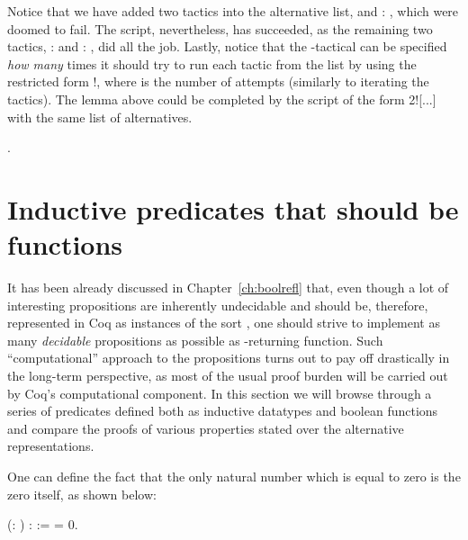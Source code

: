 Notice that we have added two tactics into the alternative list,
 and : , which were doomed to fail. The script,
nevertheless, has succeeded, as the remaining two tactics, : 
and : , did all the job. Lastly, notice that the -tactical
can be specified \textit{how many} times it should try to run each tactic
from the list by using the restricted form  !, where  is
the number of attempts (similarly to iterating the 
tactics). The lemma above could be completed by the script of the form
  2![...] with the same list of alternatives.


\begin{coqdoccode}
\coqdocemptyline
\coqdocnoindent
{}.\coqdoceol
\coqdocemptyline
\end{coqdoccode}


\section{Inductive predicates that should be functions}


It has been already discussed in Chapter~\ref{ch:boolrefl} that,
even though a lot of interesting propositions are inherently
undecidable and should be, therefore, represented in Coq as instances
of the sort , one should strive to implement as many 
\textit{decidable} propositions as possible as -returning
function. Such ``computational'' approach to the propositions turns out
to pay off drastically in the long-term perspective, as most of the
usual proof burden will be carried out by Coq's computational
component. In this section we will browse through a series of
predicates defined both as inductive datatypes and boolean functions
and compare the proofs of various properties stated over the
alternative representations.


One can define the fact that the only natural number which is equal
to zero is the zero itself, as shown below:




\begin{coqdoccode}
\coqdocemptyline
\coqdocnoindent
{}  (: ) :  :=    = 0.\coqdoceol
\coqdocemptyline
\end{coqdoccode}


